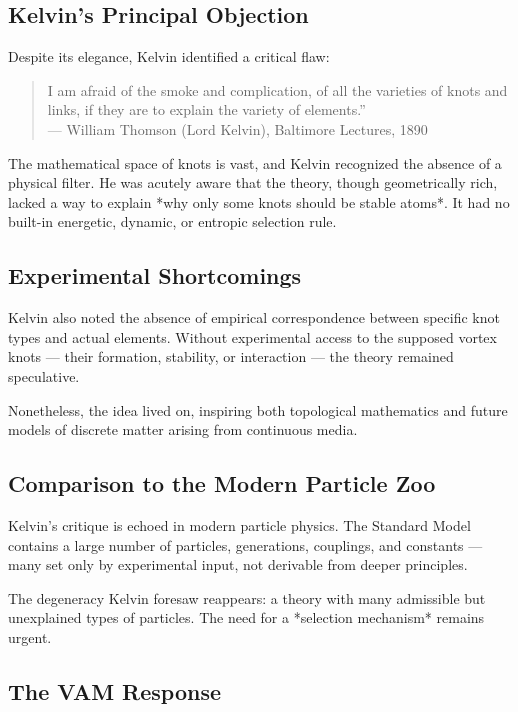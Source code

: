 \subsection*{Kelvin's Principal Objection}

Despite its elegance, Kelvin identified a critical flaw:

\begin{quote}
 \grqq I am afraid of the smoke and complication, of all the varieties of knots and links, if they are to explain the variety of elements.\textquotedblright \\
 — William Thomson (Lord Kelvin), Baltimore Lectures, 1890
\end{quote}

The mathematical space of knots is vast, and Kelvin recognized the absence of a physical filter. He was acutely aware that the theory, though geometrically rich, lacked a way to explain *why only some knots should be stable atoms*. It had no built-in energetic, dynamic, or entropic selection rule.

\subsection*{Experimental Shortcomings}

Kelvin also noted the absence of empirical correspondence between specific knot types and actual elements. Without experimental access to the supposed vortex knots — their formation, stability, or interaction — the theory remained speculative.

Nonetheless, the idea lived on, inspiring both topological mathematics and future models of discrete matter arising from continuous media.

\subsection*{Comparison to the Modern Particle Zoo}

Kelvin's critique is echoed in modern particle physics. The Standard Model contains a large number of particles, generations, couplings, and constants — many set only by experimental input, not derivable from deeper principles.

The degeneracy Kelvin foresaw reappears: a theory with many admissible but unexplained types of particles. The need for a *selection mechanism* remains urgent.

\subsection*{The VAM Response}

